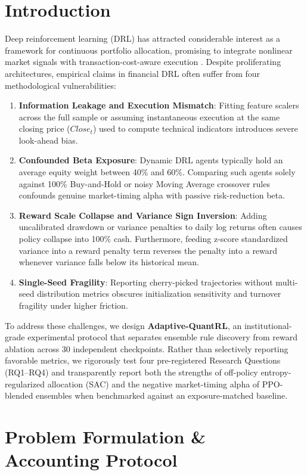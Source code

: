 \documentclass[10pt,twocolumn,conference]{IEEEtran}
\begin{document}
\section{Introduction}
Deep reinforcement learning (DRL) has attracted considerable interest as a framework for continuous portfolio allocation, promising to integrate nonlinear market signals with transaction-cost-aware execution \cite{moody2001learning, jiang2017deep, liu2020finrl}. Despite proliferating architectures, empirical claims in financial DRL often suffer from four methodological vulnerabilities:
\begin{enumerate}
    \item \textbf{Information Leakage and Execution Mismatch}: Fitting feature scalers across the full sample or assuming instantaneous execution at the same closing price ($Close_t$) used to compute technical indicators introduces severe look-ahead bias.
    \item \textbf{Confounded Beta Exposure}: Dynamic DRL agents typically hold an average equity weight between 40\% and 60\%. Comparing such agents solely against 100\% Buy-and-Hold or noisy Moving Average crossover rules confounds genuine market-timing alpha with passive risk-reduction beta.
    \item \textbf{Reward Scale Collapse and Variance Sign Inversion}: Adding uncalibrated drawdown or variance penalties to daily log returns often causes policy collapse into 100\% cash. Furthermore, feeding z-score standardized variance into a reward penalty term reverses the penalty into a reward whenever variance falls below its historical mean.
    \item \textbf{Single-Seed Fragility}: Reporting cherry-picked trajectories without multi-seed distribution metrics obscures initialization sensitivity and turnover fragility under higher friction.
\end{enumerate}

To address these challenges, we design \textbf{Adaptive-QuantRL}, an institutional-grade experimental protocol that separates ensemble rule discovery from reward ablation across 30 independent checkpoints. Rather than selectively reporting favorable metrics, we rigorously test four pre-registered Research Questions (RQ1--RQ4) and transparently report both the strengths of off-policy entropy-regularized allocation (SAC) and the negative market-timing alpha of PPO-blended ensembles when benchmarked against an exposure-matched baseline.

\section{Problem Formulation \& Accounting Protocol}
\end{document}
